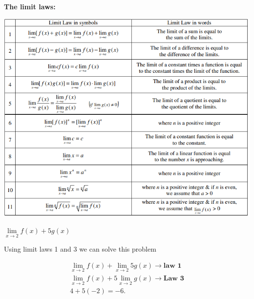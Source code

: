 \documentclass{report}
\begin{document}
    \bigbreak \noindent \bigbreak \noindent 
    \begin{large}
        \begin{center}
            \textbf{The limit laws:} 
        \end{center}
    \end{large}
   
    \bigbreak \noindent 
    \begin{center}
        \includegraphics[scale=0.65]{ ../images/laws.png }
    \end{center}
    
    \bigbreak \noindent \bigbreak \noindent 
    \bigbreak \noindent 
    \textbf{ $\lim\limits_{x \to 2}{f \left(x\right)+5g \left(x\right)}$}
    
    \bigbreak \noindent 
    \noindent Using limit laws 1 and 3 we can solve this problem

    \begin{align*}
    \lim\limits_{x \to 2}{f \left(x\right)} + \lim\limits_{x \to 2}{5g \left(x\right)} \rightarrow \textbf{law\ 1} \\ 
        \lim\limits_{x \to 2}{f \left(x\right)} + 5 \lim\limits_{x \to 2}{g \left(x\right)} \rightarrow \textbf{Law\ 3} \\ 
        4 + 5 \left(-2\right) = -6
    .\end{align*}

   \pagebreak
\end{document}
